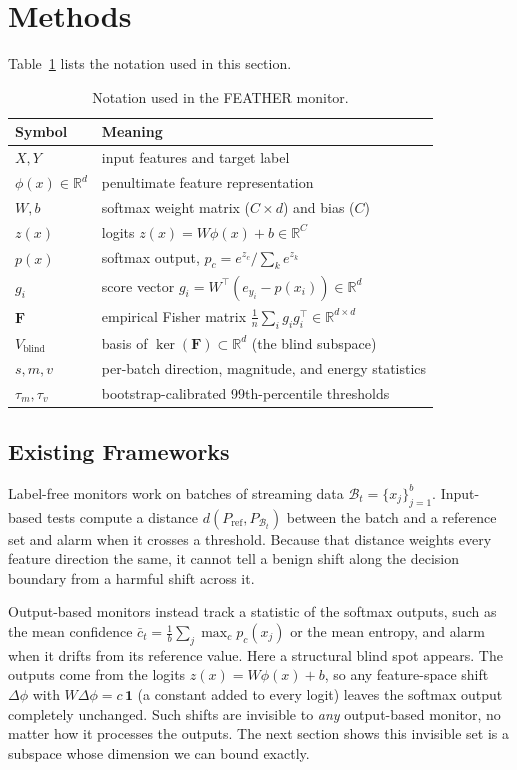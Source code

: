 \documentclass[sigconf,anonymous]{acmart}
\begin{document}
\section{Methods}
\label{sec:methods}

Table~\ref{tab:notation} lists the notation used in this section.

\begin{table}[htbp]
\caption{Notation used in the FEATHER monitor.}
\label{tab:notation}
\small
\begin{tabularx}{\columnwidth}{@{}l X@{}}
\toprule
Symbol & Meaning \\
\midrule
$X, Y$ & input features and target label \\
$\phi(x)\in\mathbb{R}^d$ & penultimate feature representation \\
$W, b$ & softmax weight matrix ($C\times d$) and bias ($C$) \\
$z(x)$ & logits $z(x)=W\phi(x)+b\in\mathbb{R}^C$ \\
$p(x)$ & softmax output, $p_c = e^{z_c}/\sum_k e^{z_k}$ \\
$g_i$ & score vector $g_i = W^{\top}(e_{y_i}-p(x_i))\in\mathbb{R}^d$ \\
$\mathbf{F}$ & empirical Fisher matrix $\tfrac{1}{n}\sum_i g_i g_i^{\top}\in\mathbb{R}^{d\times d}$ \\
$V_{\text{blind}}$ & basis of $\ker(\mathbf{F})\subset\mathbb{R}^d$ (the blind subspace) \\
$s, m, v$ & per-batch direction, magnitude, and energy statistics \\
$\tau_m, \tau_v$ & bootstrap-calibrated 99th-percentile thresholds \\
\bottomrule
\end{tabularx}
\end{table}

\subsection{Existing Frameworks}
\label{sec:existing}

Label-free monitors work on batches of streaming data $\mathcal{B}_t =
\{x_j\}_{j=1}^b$. Input-based tests compute a distance $d(P_{\text{ref}},
P_{\mathcal{B}_t})$ between the batch and a reference set and alarm when it
crosses a threshold. Because that distance weights every feature direction
the same, it cannot tell a benign shift along the decision boundary from a
harmful shift across it.

Output-based monitors instead track a statistic of the softmax outputs, such
as the mean confidence $\bar c_t = \tfrac{1}{b}\sum_j \max_c p_c(x_j)$ or the
mean entropy, and alarm when it drifts from its reference value. Here a
structural blind spot appears. The outputs come from the logits $z(x) =
W\phi(x)+b$, so any feature-space shift $\Delta\phi$ with $W\Delta\phi = c\,
\mathbf{1}$ (a constant added to every logit) leaves the softmax output
completely unchanged. Such shifts are invisible to \emph{any} output-based
monitor, no matter how it processes the outputs. The next section shows this
invisible set is a subspace whose dimension we can bound exactly.
\end{document}
